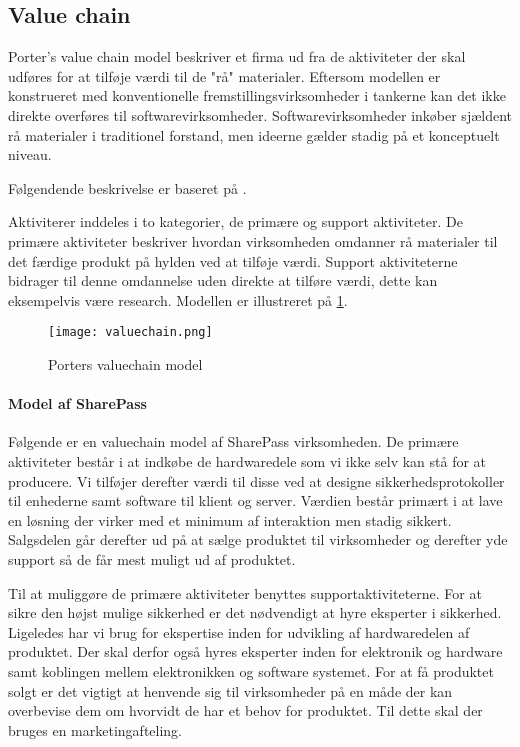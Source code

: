\subsection{Value chain}


Porter's value chain model beskriver et firma ud fra de aktiviteter der skal udføres for at tilføje værdi til de "rå" materialer.
Eftersom modellen er konstrueret med konventionelle fremstillingsvirksomheder i tankerne kan det ikke direkte overføres til softwarevirksomheder.
Softwarevirksomheder inkøber sjældent rå materialer i traditionel forstand, men ideerne gælder stadig på et konceptuelt niveau.

Følgendende beskrivelse er baseret på \citet[p.~12]{rose2012software}.

Aktiviterer inddeles i to kategorier, de primære og support aktiviteter.
De primære aktiviteter beskriver hvordan virksomheden omdanner rå materialer til det færdige produkt på hylden ved at tilføje værdi.
Support aktiviteterne bidrager til denne omdannelse uden direkte at tilføre værdi, dette kan eksempelvis være research.
Modellen er illustreret på  \cref{valuechain}.

\begin{figure}
	\texttt{[image: valuechain.png]}
	\caption{Porters valuechain model}
	\label{valuechain}
\end{figure}

\paragraph{Model af SharePass}
Følgende er en valuechain model af SharePass virksomheden.
De primære aktiviteter består i at indkøbe de hardwaredele som vi ikke selv kan stå for at producere.
Vi tilføjer derefter værdi til disse ved at designe sikkerhedsprotokoller til enhederne samt software til klient og server.
Værdien består primært i at lave en løsning der virker med et minimum af interaktion men stadig sikkert.
Salgsdelen går derefter ud på at sælge produktet til virksomheder og derefter yde support så de får mest muligt ud af produktet.

Til at muliggøre de primære aktiviteter benyttes supportaktiviteterne.
For at sikre den højst mulige sikkerhed er det nødvendigt at hyre eksperter i sikkerhed.
Ligeledes har vi brug for ekspertise inden for udvikling af hardwaredelen af produktet.
Der skal derfor også hyres eksperter inden for elektronik og hardware samt koblingen mellem elektronikken og software systemet.
For at få produktet solgt er det vigtigt at henvende sig til virksomheder på en måde der kan overbevise dem om hvorvidt de har et behov for produktet.
Til dette skal der bruges en marketingafteling.

